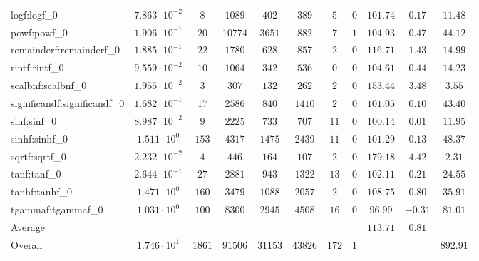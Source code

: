 \begin{tabular}{|l|c|c|c|c|c|c|c|c|c|c|}
logf:logf\_0                 & $ 7.863 \cdot 10^{-2} $ & $ 8      $ & $ 1089  $ & $ 402   $ & $ 389   $ & $ 5   $ & $ 0 $ & $ 101.74      $ & $ 0.17    $ & $ 11.48   $ \\
powf:powf\_0                 & $ 1.906 \cdot 10^{-1} $ & $ 20     $ & $ 10774 $ & $ 3651  $ & $ 882   $ & $ 7   $ & $ 1 $ & $ 104.93      $ & $ 0.47    $ & $ 44.12   $ \\
remainderf:remainderf\_0     & $ 1.885 \cdot 10^{-1} $ & $ 22     $ & $ 1780  $ & $ 628   $ & $ 857   $ & $ 2   $ & $ 0 $ & $ 116.71      $ & $ 1.43    $ & $ 14.99   $ \\
rintf:rintf\_0               & $ 9.559 \cdot 10^{-2} $ & $ 10     $ & $ 1064  $ & $ 342   $ & $ 536   $ & $ 0   $ & $ 0 $ & $ 104.61      $ & $ 0.44    $ & $ 14.23   $ \\
scalbnf:scalbnf\_0           & $ 1.955 \cdot 10^{-2} $ & $ 3      $ & $ 307   $ & $ 132   $ & $ 262   $ & $ 2   $ & $ 0 $ & $ 153.44      $ & $ 3.48    $ & $ 3.55    $ \\
significandf:significandf\_0 & $ 1.682 \cdot 10^{-1} $ & $ 17     $ & $ 2586  $ & $ 840   $ & $ 1410  $ & $ 2   $ & $ 0 $ & $ 101.05      $ & $ 0.10    $ & $ 43.40   $ \\
sinf:sinf\_0                 & $ 8.987 \cdot 10^{-2} $ & $ 9      $ & $ 2225  $ & $ 733   $ & $ 707   $ & $ 11  $ & $ 0 $ & $ 100.14      $ & $ 0.01    $ & $ 11.95   $ \\
sinhf:sinhf\_0               & $ 1.511 \cdot 10^{0}  $ & $ 153    $ & $ 4317  $ & $ 1475  $ & $ 2439  $ & $ 11  $ & $ 0 $ & $ 101.29      $ & $ 0.13    $ & $ 48.37   $ \\
sqrtf:sqrtf\_0               & $ 2.232 \cdot 10^{-2} $ & $ 4      $ & $ 446   $ & $ 164   $ & $ 107   $ & $ 2   $ & $ 0 $ & $ 179.18      $ & $ 4.42    $ & $ 2.31    $ \\
tanf:tanf\_0                 & $ 2.644 \cdot 10^{-1} $ & $ 27     $ & $ 2881  $ & $ 943   $ & $ 1322  $ & $ 13  $ & $ 0 $ & $ 102.11      $ & $ 0.21    $ & $ 24.55   $ \\
tanhf:tanhf\_0               & $ 1.471 \cdot 10^{0}  $ & $ 160    $ & $ 3479  $ & $ 1088  $ & $ 2057  $ & $ 2   $ & $ 0 $ & $ 108.75      $ & $ 0.80    $ & $ 35.91   $ \\
tgammaf:tgammaf\_0           & $ 1.031 \cdot 10^{0}  $ & $ 100    $ & $ 8300  $ & $ 2945  $ & $ 4508  $ & $ 16  $ & $ 0 $ & $ 96.99       $ & $ -0.31   $ & $ 81.01   $ \\
\hline
Average                      & $                     $ & $        $ & $       $ & $       $ & $       $ & $     $ & $   $ & $ 113.71      $ & $ 0.81    $ & $         $ \\
\hline
Overall                      & $ 1.746 \cdot 10^{1}  $ & $ 1861   $ & $ 91506 $ & $ 31153 $ & $ 43826 $ & $ 172 $ & $ 1 $ & $             $ & $         $ & $ 892.91  $ \\
\hline
\end{tabular}
